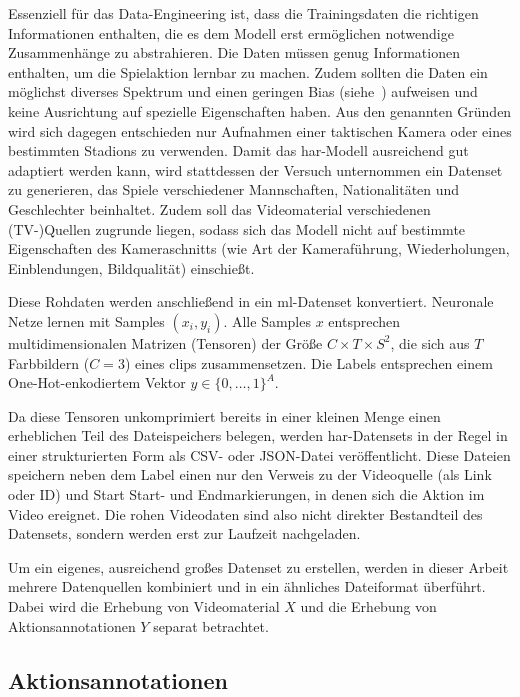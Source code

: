 Essenziell für das Data-Engineering ist, dass die Trainingsdaten die richtigen Informationen enthalten, die es dem Modell erst ermöglichen notwendige Zusammenhänge zu abstrahieren.
Die Daten müssen genug Informationen enthalten, um die Spielaktion lernbar zu machen.
Zudem sollten die Daten ein möglichst diverses Spektrum und einen geringen Bias (siehe~\cite{Gugger20}) aufweisen und keine Ausrichtung auf spezielle Eigenschaften haben.
Aus den genannten Gründen wird sich dagegen entschieden nur Aufnahmen einer taktischen Kamera oder eines bestimmten Stadions zu verwenden.
Damit das \gls{har}-Modell ausreichend gut adaptiert werden kann, wird stattdessen der Versuch unternommen ein Datenset zu generieren, das Spiele verschiedener Mannschaften, Nationalitäten und Geschlechter beinhaltet.
Zudem soll das Videomaterial verschiedenen (TV-)Quellen zugrunde liegen, sodass sich das Modell nicht auf bestimmte Eigenschaften des Kameraschnitts (wie Art der Kameraführung, Wiederholungen, Einblendungen, Bildqualität) einschießt.

Diese Rohdaten werden anschließend in ein \gls{ml}-Datenset konvertiert.
Neuronale Netze lernen mit Samples $(x_i, y_i)$.
Alle Samples $x$ entsprechen multidimensionalen Matrizen (Tensoren) der Größe $C \times T \times S^2$, die sich aus $T$ Farbbildern ($C=3$) eines \glspl{clip} zusammensetzen.
Die Labels entsprechen einem One-Hot-enkodiertem Vektor $y \in \{0, \dots, 1\}^A$.

Da diese Tensoren unkomprimiert bereits in einer kleinen Menge einen erheblichen Teil des Dateispeichers belegen, werden \gls{har}-Datensets in der Regel in einer strukturierten Form als CSV- oder JSON-Datei veröffentlicht.
Diese Dateien speichern neben dem Label einen nur den Verweis zu der Videoquelle (als Link oder ID) und Start \ggf Start- und Endmarkierungen, in denen sich die Aktion im Video ereignet.
Die rohen Videodaten sind also nicht direkter Bestandteil des Datensets, sondern werden erst zur Laufzeit nachgeladen.

Um ein eigenes, ausreichend großes Datenset zu erstellen, werden in dieser Arbeit mehrere Datenquellen kombiniert und in ein ähnliches Dateiformat überführt.
Dabei wird die Erhebung von Videomaterial $X$ und die Erhebung von Aktionsannotationen $Y$ separat betrachtet.

\subsection{Aktionsannotationen}
\label{subsec:aktionsannotationen}


